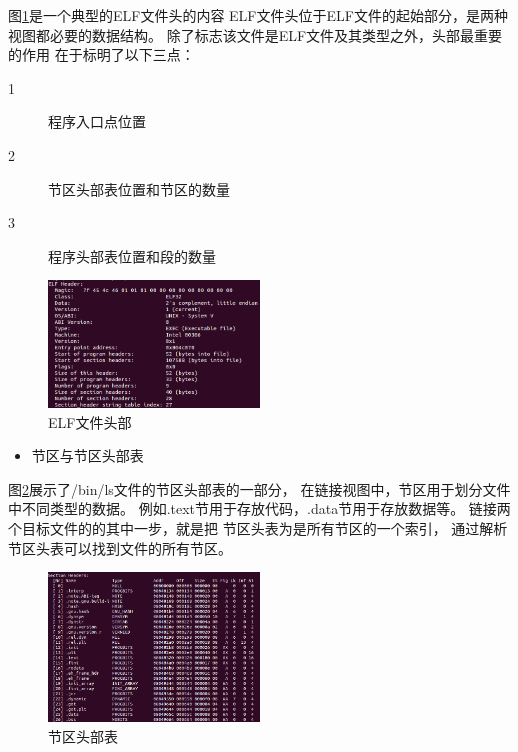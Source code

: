 图\ref{header}是一个典型的ELF文件头的内容
ELF文件头位于ELF文件的起始部分，是两种视图都必要的数据结构。
除了标志该文件是ELF文件及其类型之外，头部最重要的作用
在于标明了以下三点：

\begin{description}
  \item [1]  程序入口点位置
  \item [2]  节区头部表位置和节区的数量
  \item [3]  程序头部表位置和段的数量 
\end{description}

\begin{figure}[h!]
  \centering
  \includegraphics[width=0.5\textwidth]{figure/header.png}
  \caption{ELF文件头部}
  \label{header}
\end{figure}

\begin{itemize}
  \item 节区与节区头部表
\end{itemize}

图\ref{sections}展示了/bin/ls文件的节区头部表的一部分，
在链接视图中，节区用于划分文件中不同类型的数据。
例如.text节用于存放代码，.data节用于存放数据等。
链接两个目标文件的的其中一步，就是把
节区头表为是所有节区的一个索引，
通过解析节区头表可以找到文件的所有节区。

\begin{figure}[h!]
  \centering
  \includegraphics[width=0.5\textwidth]{figure/sections.png}
  \caption{节区头部表}
  \label{sections}
\end{figure}

